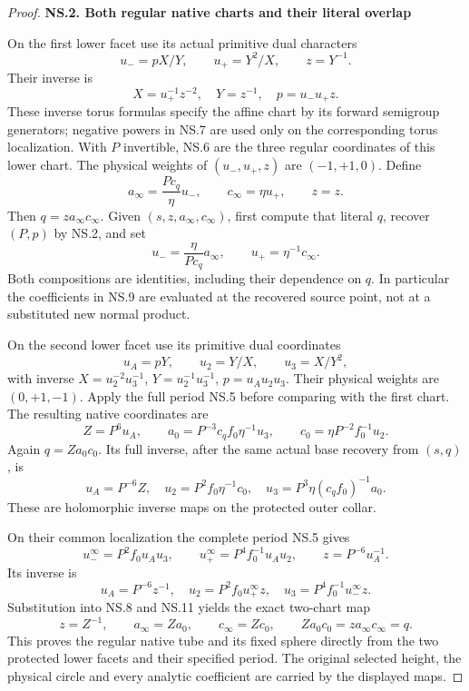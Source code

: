 \begin{proof}
\medskip\noindent\textbf{NS.2. Both regular native charts and their literal overlap}

\par\nobreak

On the first lower facet use its actual primitive dual characters
\[
 u_-=pX/Y,\qquad u_+=Y^2/X,\qquad z=Y^{-1}.
 \tag{NS.6}
\]
Their inverse is
\[
 X=u_+^{-1}z^{-2},\quad Y=z^{-1},\quad p=u_-u_+z.
 \tag{NS.7}
\]
These inverse torus formulas specify the affine chart by its forward
semigroup generators; negative powers in NS.7 are used only on the
corresponding torus localization. With \(P\) invertible, NS.6 are
the three regular coordinates of this lower chart. The physical
weights of \((u_-,u_+,z)\) are \((-1,+1,0)\). Define
\[
 a_\infty=\frac{Pc_q}{\eta}u_-,\qquad
 c_\infty=\eta u_+,\qquad z=z.
 \tag{NS.8}
\]
Then \(q=z a_\infty c_\infty\). Given \((s,z,a_\infty,c_\infty)\),
first compute that literal \(q\), recover \((P,p)\) by NS.2, and set
\[
 u_-=\frac{\eta}{Pc_q}a_\infty,\qquad
 u_+=\eta^{-1}c_\infty.
 \tag{NS.9}
\]
Both compositions are identities, including their dependence on
\(q\). In particular the coefficients in NS.9 are evaluated at the
recovered source point, not at a substituted new normal product.

On the second lower facet use its primitive dual coordinates
\[
 u_A=pY,\qquad u_2=Y/X,\qquad u_3=X/Y^2,
 \tag{NS.10}
\]
with inverse \(X=u_2^{-2}u_3^{-1}\),
\(Y=u_2^{-1}u_3^{-1}\), \(p=u_Au_2u_3\).
Their physical weights are \((0,+1,-1)\).
Apply the full period NS.5 before comparing with the first chart.
The resulting native coordinates are
\[
 Z=P^6u_A,\qquad
 a_0=P^{-3}c_q f_0\eta^{-1}u_3,\qquad
 c_0=\eta P^{-2}f_0^{-1}u_2.
 \tag{NS.11}
\]
Again \(q=Za_0c_0\). Its full inverse, after the same actual base
recovery from \((s,q)\), is
\[
 u_A=P^{-6}Z,\quad
 u_2=P^2 f_0\eta^{-1}c_0,\quad
 u_3=P^3\eta(c_qf_0)^{-1}a_0.
 \tag{NS.12}
\]
These are holomorphic inverse maps on the protected outer collar.

On their common localization the complete period NS.5 gives
\[
 u_-^{\infty}=P^2f_0u_Au_3,\qquad
 u_+^{\infty}=P^4f_0^{-1}u_Au_2,\qquad
 z=P^{-6}u_A^{-1}.
 \tag{NS.13}
\]
Its inverse is
\[
 u_A=P^{-6}z^{-1},\quad
 u_2=P^2f_0u_+^{\infty}z,\quad
 u_3=P^4f_0^{-1}u_-^{\infty}z.
 \tag{NS.14}
\]
Substitution into NS.8 and NS.11 yields the exact two-chart map
\[
 z=Z^{-1},\qquad a_\infty=Za_0,\qquad c_\infty=Zc_0,
 \qquad Za_0c_0=z a_\infty c_\infty=q.
 \tag{NS.15}
\]
This proves the regular native tube and its fixed sphere directly
from the two protected lower facets and their specified period.
The original selected height, the physical circle and every analytic
coefficient are carried by the displayed maps.


\end{proof}
